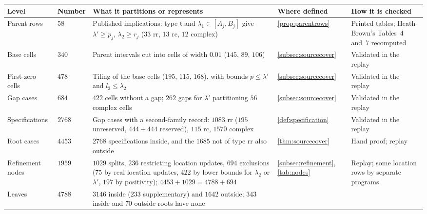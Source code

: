\begin{table}[tp]
\centering
\footnotesize
\setlength{\tabcolsep}{4pt}
\begin{tabular}{@{}>{\raggedright\arraybackslash}p{}
                >{\raggedleft\arraybackslash}p{}
                >{\raggedright\arraybackslash}p{}
                >{\raggedright\arraybackslash}p{}
                >{\raggedright\arraybackslash}p{}@{}}
\toprule
Level & Number & What it partitions or represents & Where defined & How it is checked\\
\midrule
Parent rows & $58$ &
  Published implications: type $\mathfrak t$ and $\lambda_1\in[A_j,B_j]$ give $\lambda'\ge p_j$,
  $\lambda_2\ge r_j$ ($33$ $\mathrm{rr}$, $13$ $\mathrm{rc}$, $12$ $\mathrm{complex}$) &
  \cref{prop:parentrows} &
  Printed tables; Heath-Brown's Tables~4 and~7 recomputed\\
Base cells & $340$ &
  Parent intervals cut into cells of width $0.01$ ($145$, $89$, $106$) &
  \cref{subsec:sourcecover} &
  Validated in the replay\\
First-zero cells & $478$ &
  Tiling of the base cells ($195$, $115$, $168$), with bounds $p\le\lambda'$ and $l_2\le\lambda_2$ &
  \cref{subsec:sourcecover} &
  Validated in the replay\\
Gap cases & $684$ &
  $422$ cells without a gap; $262$ gaps for $\lambda'$ partitioning $56$ $\mathrm{complex}$ cells &
  \cref{subsec:sourcecover} &
  Validated in the replay\\
Specifications & $2768$ &
  Gap cases with a second-family record: $1083$ $\mathrm{rr}$ ($195$ unreserved, $444+444$
  reserved), $115$ $\mathrm{rc}$, $1570$ $\mathrm{complex}$ &
  \cref{def:specification} &
  Validated in the replay\\
Root cases & $4453$ &
  $2768$ specifications inside, and the $1685$ not of type $\mathrm{rr}$ also outside &
  \cref{thm:sourcecover} &
  Hand proof; replay\\
Refinement nodes & $1959$ &
  $1029$ splits, $236$ restricting location updates, $694$ exclusions ($75$ by real location updates, $422$ by
  lower bounds for $\lambda_2$ or $\lambda'$, $197$ by positivity); $4453+1029=4788+694$ &
  \cref{subsec:refinement}, \cref{tab:nodes} &
  Replay; some location rows by separate programs\\
Leaves & $4788$ &
  $3146$ inside ($233$ supplementary) and $1642$ outside; $343$ inside and $70$ outside roots have none &

\end{tabular}
\end{table}
